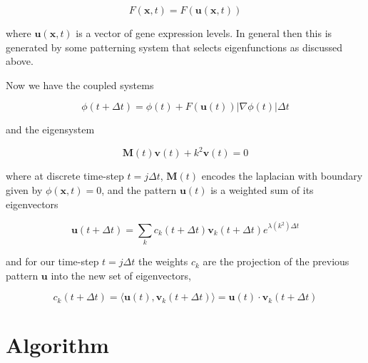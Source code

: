 \documentclass{article}
\renewcommand{\vec}[1]{\mathbf{#1}}
\newcommand{\mat}{\mathbf}
\begin{document}
\begin{equation}
F(\vec{x},t) = F(\vec{u}(\vec{x},t))
\end{equation}

where $\vec{u}(\vec{x},t)$ is a vector of gene expression levels. In general
then this is generated by some patterning system that selects eigenfunctions as
discussed above. 

Now we have the coupled systems

\begin{equation}
\phi(t+\Delta t) = \phi(t) + F(\vec{u}(t)) \left|\nabla\phi(t)\right| \Delta t 
\end{equation}

and the eigensystem

\begin{equation}
\mat{M}(t) \vec{v}(t) + k^2 \vec{v}(t) = 0
\end{equation}

where at discrete time-step $t=j\Delta t$, $\mat{M}(t)$ encodes the laplacian
with boundary given by $\phi(\vec{x},t)=0$, and the pattern $\vec{u}(t)$ is a
weighted sum of its eigenvectors

\begin{equation}
\vec{u}(t+\Delta t) = \sum_{k} c_k(t+\Delta t) \vec{v}_k(t+\Delta t) e^{\lambda(k^2) \Delta t}
\end{equation}

and for our time-step $t=j\Delta t$ the weights $c_k$ are the projection of
the previous pattern $\vec{u}$ into the new set of eigenvectors,

\begin{equation}
c_k(t+\Delta t) = \langle \vec{u}(t), \vec{v}_k(t+\Delta t) \rangle =
\vec{u}(t) \cdot \vec{v}_k(t+\Delta t)
\end{equation}

\section{Algorithm}
\end{document}
